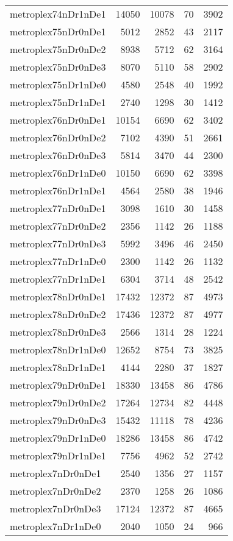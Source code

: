 \begin{longtable}{lrrrr}
metroplex74nDr1nDe1 & 14050 & 10078 & 70 & 3902 \\
metroplex75nDr0nDe1 & 5012 & 2852 & 43 & 2117 \\
metroplex75nDr0nDe2 & 8938 & 5712 & 62 & 3164 \\
metroplex75nDr0nDe3 & 8070 & 5110 & 58 & 2902 \\
metroplex75nDr1nDe0 & 4580 & 2548 & 40 & 1992 \\
metroplex75nDr1nDe1 & 2740 & 1298 & 30 & 1412 \\
metroplex76nDr0nDe1 & 10154 & 6690 & 62 & 3402 \\
metroplex76nDr0nDe2 & 7102 & 4390 & 51 & 2661 \\
metroplex76nDr0nDe3 & 5814 & 3470 & 44 & 2300 \\
metroplex76nDr1nDe0 & 10150 & 6690 & 62 & 3398 \\
metroplex76nDr1nDe1 & 4564 & 2580 & 38 & 1946 \\
metroplex77nDr0nDe1 & 3098 & 1610 & 30 & 1458 \\
metroplex77nDr0nDe2 & 2356 & 1142 & 26 & 1188 \\
metroplex77nDr0nDe3 & 5992 & 3496 & 46 & 2450 \\
metroplex77nDr1nDe0 & 2300 & 1142 & 26 & 1132 \\
metroplex77nDr1nDe1 & 6304 & 3714 & 48 & 2542 \\
metroplex78nDr0nDe1 & 17432 & 12372 & 87 & 4973 \\
metroplex78nDr0nDe2 & 17436 & 12372 & 87 & 4977 \\
metroplex78nDr0nDe3 & 2566 & 1314 & 28 & 1224 \\
metroplex78nDr1nDe0 & 12652 & 8754 & 73 & 3825 \\
metroplex78nDr1nDe1 & 4144 & 2280 & 37 & 1827 \\
metroplex79nDr0nDe1 & 18330 & 13458 & 86 & 4786 \\
metroplex79nDr0nDe2 & 17264 & 12734 & 82 & 4448 \\
metroplex79nDr0nDe3 & 15432 & 11118 & 78 & 4236 \\
metroplex79nDr1nDe0 & 18286 & 13458 & 86 & 4742 \\
metroplex79nDr1nDe1 & 7756 & 4962 & 52 & 2742 \\
metroplex7nDr0nDe1 & 2540 & 1356 & 27 & 1157 \\
metroplex7nDr0nDe2 & 2370 & 1258 & 26 & 1086 \\
metroplex7nDr0nDe3 & 17124 & 12372 & 87 & 4665 \\
metroplex7nDr1nDe0 & 2040 & 1050 & 24 & 966 \\

\end{longtable}

